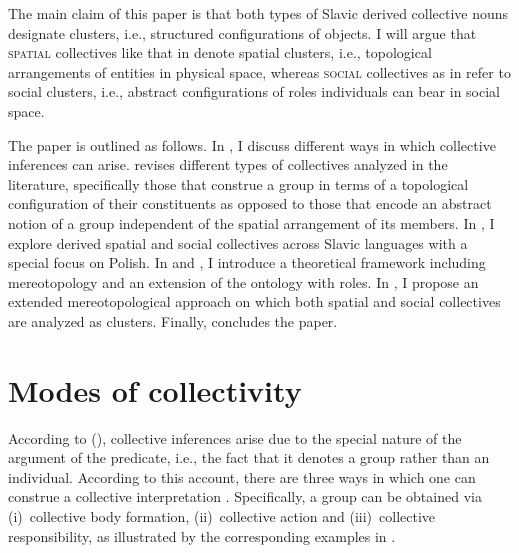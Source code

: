 \documentclass[output=paper]{langscibook}
\begin{document}
\ea \label{wan:ex:polish-collectives} \label{wan:ex:polish-kwiecie}
\label{wan:ex:polish-duchowienstwo}
\z
\z

\noindent The main claim of this paper is that both types of Slavic derived collective nouns designate clusters, i.e., structured configurations of objects. I will argue that \textsc{spatial} collectives like that in  denote spatial clusters, i.e., topological arrangements of entities in physical space, whereas \textsc{social} collectives as in  refer to social clusters, i.e., abstract configurations of roles individuals can bear in social space. 

The paper is outlined as follows. In , I discuss different ways in which collective inferences can arise.  revises different types of collectives analyzed in the literature, specifically those that construe a group in terms of a topological configuration of their constituents as opposed to those that encode an abstract notion of a group independent of the spatial arrangement of its members. In , I explore derived spatial and social collectives across Slavic languages with a special focus on Polish. In  and , I introduce a theoretical framework including mereotopology and an extension of the ontology with roles. In , I propose an extended mereotopological approach on which both spatial and social collectives are analyzed as clusters. Finally,  concludes the paper.

\section{Modes of collectivity}\label{wan:sec:modes-of-collectivity}

According to \citeauthor{landman1989groupsi} (\citeyear{landman1989groupsi,landman2000events}), collective inferences arise due to the special nature of the argument of the predicate, i.e., the fact that it denotes a group rather than an individual. According to this account, there are three ways in which one can construe a collective interpretation \citep[165--169]{landman2000events}. Specifically, a group can be obtained via (i)~collective body formation, (ii)~collective action and (iii)~collective responsibility, as illustrated by the corresponding examples in .
\end{document}
